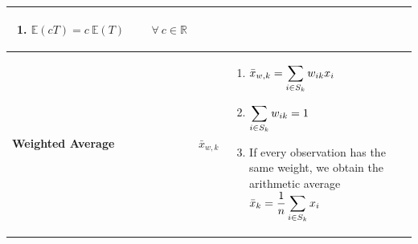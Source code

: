 \begin{customArrayStretch}{1.3}
\begin{longtable}{>{\RaggedRight\arraybackslash}p{4cm} >{\centering\arraybackslash}p{0.5cm} p{10.5cm}}
\begin{minipage}{10.3cm}
\begin{enumerate}[itemsep=0.2cm]
            \item $
                \mathbb{E}(cT) = c\ \mathbb{E}(T)
                \hspace{1cm} \forall\  c \in \mathbb{R}
            $
            \hfill \cite{statistics/book/Statistics-for-Data-Scientists/Maurits-Kaptein}

        \end{enumerate}
        \vspace{0.15cm}
    \end{minipage} 
    \\ \hline


\textbf{Weighted Average} &
    $\bar{x}_{w,k}$ &
    \begin{minipage}{10.3cm}
        \vspace{0.15cm}
        \begin{enumerate}[itemsep=0.2cm]
            \item $
                \bar{x}_{w,k}
                = \displaystyle\sum_{i \in S_k} w_{ik}x_i
            $
            \hfill \cite{statistics/book/Statistics-for-Data-Scientists/Maurits-Kaptein}

            \item $
                \displaystyle\sum_{i \in S_k} w_{ik} = 1
            $
            \hfill \cite{statistics/book/Statistics-for-Data-Scientists/Maurits-Kaptein}

            \item If every observation has the same weight, we obtain the arithmetic average $\bar{x}_k = \dfrac{1}{n} \displaystyle\sum_{i \in S_k} x_i$
            \hfill \cite{statistics/book/Statistics-for-Data-Scientists/Maurits-Kaptein}

        \end{enumerate}
        \vspace{0.15cm}
    \end{minipage} 
    \\ \hline


\end{longtable}
\end{customArrayStretch}


